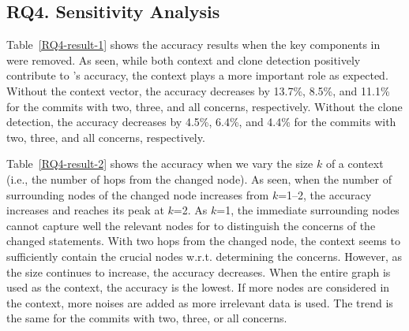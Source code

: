 \subsection{{\bf RQ4. Sensitivity Analysis}}




Table~\ref{RQ4-result-1} shows the accuracy results when the key
components in {\tool} were removed. As seen, while both context and
clone detection positively contribute to {\tool}'s accuracy, the
context plays a more important role as expected. Without the context
vector, the accuracy decreases by 13.7\%, 8.5\%, and 11.1\% for the
commits with two, three, and all concerns, respectively. Without the
clone detection, the accuracy decreases by 4.5\%, 6.4\%, and 4.4\% for
the commits with two, three, and all concerns, respectively.






Table~\ref{RQ4-result-2} shows the accuracy when we vary the size $k$
of a context (i.e., the number of hops from the changed node). As
seen, when the number of surrounding nodes of the changed node
increases from $k$=1--2, the accuracy increases and reaches its peak
at $k$=2. As $k$=1, the immediate surrounding nodes cannot capture
well the relevant nodes for {\tool} to distinguish the concerns of the
changed statements. With two hops from the changed node, the context
seems to sufficiently contain the crucial nodes w.r.t. determining the
concerns. However, as the size continues to increase, the accuracy
decreases. When the entire graph is used as the context, the accuracy
is the lowest. If more nodes are considered in the context, more
noises are added as more irrelevant data is used.  The trend is the
same for the commits with two, three, or all concerns.


